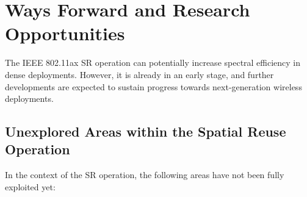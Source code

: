 \documentclass[preprint,12pt]{elsarticle}
\begin{document}
\section{Ways Forward and Research Opportunities}
\label{section:ways_forwad}
The IEEE 802.11ax SR operation can potentially increase spectral efficiency in dense deployments. However, it is already in an early stage, and further developments are expected to sustain progress towards next-generation wireless deployments. 

\subsection{Unexplored Areas within the Spatial Reuse Operation}
In the context of the SR operation, the following areas have not been fully exploited yet:
\end{document}
